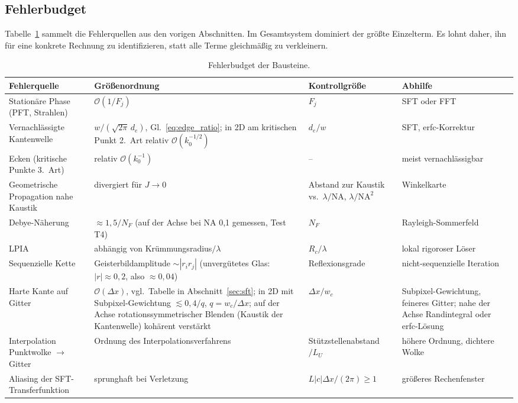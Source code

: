 \documentclass[11pt,a4paper]{scrartcl}
\theoremstyle{insightstyle}
\newcommand{\NA}{\mathrm{NA}}
\begin{document}
\subsection{Fehlerbudget}\label{sec:errors}
Tabelle~\ref{tab:errors} sammelt die Fehlerquellen aus den vorigen Abschnitten. Im Gesamtsystem dominiert der größte Einzelterm. Es lohnt daher, ihn für eine konkrete Rechnung zu identifizieren, statt alle Terme gleichmäßig zu verkleinern.

\begin{table}[htbp]
\centering
\renewcommand{\arraystretch}{1.3}
\small
\begin{tabularx}{\textwidth}{>{\raggedright\arraybackslash}p{3.4cm} >{\raggedright\arraybackslash}X >{\raggedright\arraybackslash}p{2.7cm} >{\raggedright\arraybackslash}p{3.4cm}}
\toprule
Fehlerquelle & Größenordnung & Kontrollgröße & Abhilfe\\
\midrule
Stationäre Phase (PFT, Strahlen) & $\mathcal O(1/F_j)$ & $F_j$ & SFT oder FFT\\
\addlinespace
Vernachlässigte Kantenwelle & $w/(\sqrt{2\pi}\,d_e)$, Gl.~\eqref{eq:edge_ratio}; in 2D am kritischen Punkt 2.~Art relativ $\mathcal O(k_0^{-1/2})$ & $d_e/w$ & SFT, erfc-Korrektur\\
\addlinespace
Ecken (kritische Punkte 3.~Art) & relativ $\mathcal O(k_0^{-1})$ & -- & meist vernachlässigbar\\
\addlinespace
Geometrische Propagation nahe Kaustik & divergiert für $J\to0$ & Abstand zur Kaustik vs.\ $\lambda/\NA$, $\lambda/\NA^2$ & Winkelkarte\\
\addlinespace
Debye-Näherung & $\approx1{,}5/N_F$ (auf der Achse bei NA 0,1 gemessen, Test T4)~\cite{wolfli1981} & $N_F$ & Rayleigh-Sommerfeld\\
\addlinespace
LPIA & abhängig von Krümmungsradius$/\lambda$~\cite{vonpfeil2000} & $R_c/\lambda$ & lokal rigoroser Löser\\
\addlinespace
Sequenzielle Kette & Geisterbild\-amplitude $\sim|r_ir_j|$ (unvergütetes Glas: $|r|\approx0{,}2$, also $\approx0{,}04$) & Reflexionsgrade & nicht-sequenzielle Iteration\\
\addlinespace
Harte Kante auf Gitter & $\mathcal O(\Delta x)$, vgl.\ Tabelle in Abschnitt~\ref{sec:sft}; in 2D mit Subpixel-Gewichtung $\lesssim0{,}4/q$, $q=w_c/\Delta x$; auf der Achse rotationssymmetrischer Blenden (Kaustik der Kantenwelle) kohärent verstärkt & $\Delta x/w_c$ & Subpixel-Gewichtung, feineres Gitter; nahe der Achse Randintegral oder erfc-Lösung\\
\addlinespace
Interpolation Punktwolke $\to$ Gitter & Ordnung des Interpolationsverfahrens & Stützstellen\-abstand $/L_U$ & höhere Ordnung, dichtere Wolke\\
\addlinespace
Aliasing der SFT-Transferfunktion & sprunghaft bei Verletzung & $L|c|\Delta x/(2\pi)\ge1$ & größeres Rechenfenster\\
\bottomrule
\end{tabularx}
\caption{Fehlerbudget der Bausteine.}
\label{tab:errors}
\end{table}
\end{document}
